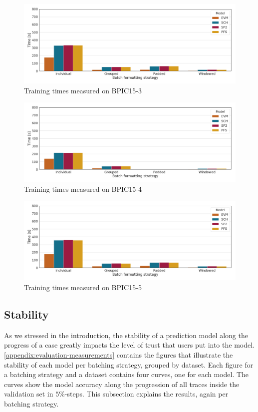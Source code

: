 \begin{figure}
    \centering
    \includegraphics[width=\textwidth]{gfx/bpic2015_3/train_timings.png}
    \caption{Training times measured on BPIC15-3}
    \label{fig:BPIC15-3-training-timings}
\end{figure}
\begin{figure}
    \centering
    \includegraphics[width=\textwidth]{gfx/bpic2015_4/train_timings.png}
    \caption{Training times measured on BPIC15-4}
    \label{fig:BPIC15-4-training-timings}
\end{figure}
\begin{figure}
    \centering
    \includegraphics[width=\textwidth]{gfx/bpic2015_5/train_timings.png}
    \caption{Training times measured on BPIC15-5}
    \label{fig:BPIC15-5-training-timings}
\end{figure}

\FloatBarrier
\subsection*{Stability}
As we stressed in the introduction, the stability of a prediction model along the progress of a case greatly impacts the level of trust that users put into the model. \autoref{appendix:evaluation-measurements} contains the figures that illustrate the stability of each model per batching strategy, grouped by dataset. Each figure for a batching strategy and a dataset contains four curves, one for each model. The curves show the model accuracy along the progression of all traces inside the validation set in $5\%$-steps. This subsection explains the results, again per batching strategy.\\

